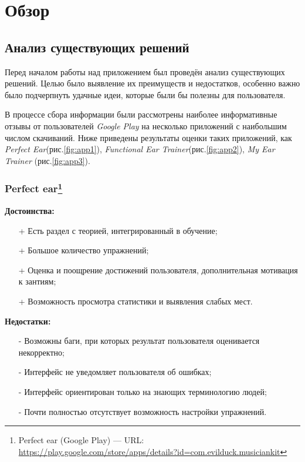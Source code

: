 \chapter{Обзор}
\section{Анализ существующих решений}
Перед началом работы над приложением был проведён анализ существующих решений. Целью было выявление их преимуществ и недостатков, особенно важно было подчерпнуть удачные идеи, которые были бы полезны для пользователя. \par
В процессе сбора информации были рассмотрены наиболее информативные отзывы от пользователей \textit{Google Play} на несколько приложений с наибольшим числом скачиваний. Ниже приведены результаты оценки таких приложений, как \textit{Perfect Ear}(рис.\ref{fig:app1}), \textit{Functional Ear Trainer}(рис.\ref{fig:app2}), \textit{My Ear Trainer} (рис.\ref{fig:app3}).\par
\subsection[Perfect ear]{Perfect ear\footnote{Perfect ear (Google Play) --- URL: \url{https://play.google.com/store/apps/details?id=com.evilduck.musiciankit}}}

\begin{minipage}[t]{0.45\textwidth}
\textbf{Достоинства:}
\begin{itemize}
  \item[+] Есть раздел с теорией, интегрированный в обучение;
  \item[+] Большое количество упражнений;
  \item[+] Оценка и поощрение достижений пользователя, дополнительная мотивация к зантиям;
  \item[+] Возможность просмотра статистики и выявления слабых мест.
\end{itemize}
\end{minipage}
\hfill
\begin{minipage}[t]{0.45\textwidth}
\textbf{Недостатки:}
\begin{itemize}
  \item[-] Возможны баги, при которых результат пользователя оценивается некорректно;
  \item[-] Интерфейс не уведомляет пользователя об ошибках;
  \item[-] Интерфейс ориентирован только на знающих терминологию людей;
  \item[-] Почти полностью отсутствует возможность настройки упражнений.
\end{itemize}
\end{minipage} 

